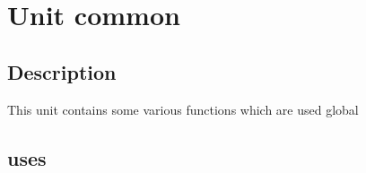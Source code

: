 \documentclass{report}
\begin{document}
\chapter{Unit common}
\label{common}
\section{Description}
This unit contains some various functions which are used global
\section{uses}
\begin{itemize}
\item \begin{ttfamily}Classes\end{ttfamily}\item \begin{ttfamily}SysUtils\end{ttfamily}\item \begin{ttfamil
\end{itemize}
\end{document}
